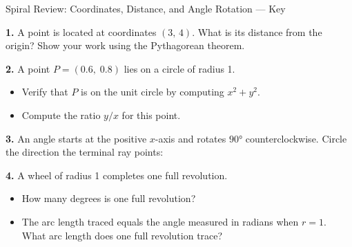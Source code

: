 \documentclass[10pt]{article}
\begin{document}
\namedateperiod

\vspace{0.10in}

\begin{notesbox}{Spiral Review: Coordinates, Distance, and Angle Rotation --- Key}

\textbf{1.} A point is located at coordinates $(3,\, 4)$. What is its distance from the origin?
Show your work using the Pythagorean theorem.

\medskip
{}

\vspace{0.18in}

\textbf{2.} A point $P = (0.6,\; 0.8)$ lies on a circle of radius 1.
\begin{itemize}[leftmargin=1.6em, itemsep=2pt]
  \item[(a)] Verify that $P$ is on the unit circle by computing $x^2 + y^2$. \hfill
  \item[(b)] Compute the ratio $y/x$ for this point. \hfill
\end{itemize}

\vspace{0.18in}

\textbf{3.} An angle starts at the positive $x$-axis and rotates $90°$ counterclockwise.
Circle the direction the terminal ray points:

\medskip
{}

\vspace{0.18in}

\textbf{4.} A wheel of radius 1 completes one full revolution.
\begin{itemize}[leftmargin=1.6em, itemsep=2pt]
  \item[(a)] How many degrees is one full revolution? \hfill {}
  \item[(b)] The arc length traced equals the angle measured in radians when $r = 1$.
        What arc length does one full revolution trace? \hfill \ans{$2\pi$}
\end{itemize}

\end{notesbox}
\end{document}
